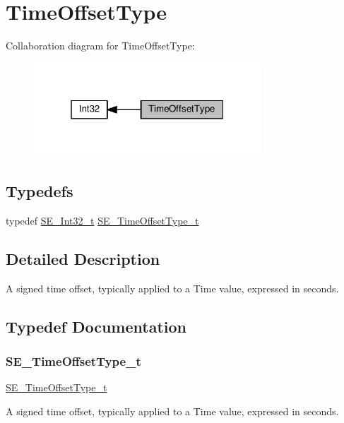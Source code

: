 \hypertarget{group__TimeOffsetType}{}\section{Time\+Offset\+Type}
\label{group__TimeOffsetType}
Collaboration diagram for Time\+Offset\+Type\+:\nopagebreak
\begin{figure}[H]
\begin{center}
\leavevmode
\includegraphics[width=241pt]{group__TimeOffsetType}
\end{center}
\end{figure}
\subsection*{Typedefs}
\begin{DoxyCompactItemize}
\item 
typedef \hyperlink{group__Int32_gaa7afc819cfc8033c5fa408e34da8b71a}{S\+E\+\_\+\+Int32\+\_\+t} \hyperlink{group__TimeOffsetType_ga3de71705a6723a1013cf383b705cbd8a}{S\+E\+\_\+\+Time\+Offset\+Type\+\_\+t}
\end{DoxyCompactItemize}


\subsection{Detailed Description}
A signed time offset, typically applied to a Time value, expressed in seconds. 

\subsection{Typedef Documentation}
\mbox{\label{group__TimeOffsetType_ga3de71705a6723a1013cf383b705cbd8a}} 
\subsubsection{\texorpdfstring{S\+E\+\_\+\+Time\+Offset\+Type\+\_\+t}{SE\_TimeOffsetType\_t}}
{\footnotesize\ttfamily \hyperlink{group__TimeOffsetType_ga3de71705a6723a1013cf383b705cbd8a}{S\+E\+\_\+\+Time\+Offset\+Type\+\_\+t}}

A signed time offset, typically applied to a Time value, expressed in seconds. 
